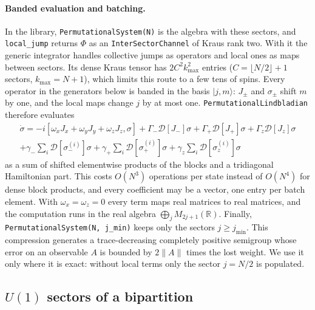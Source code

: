 \documentclass[11pt]{article}
\newcommand{\R}{\mathbb{R}}
\newcommand{\D}{\mathcal{D}}
\newcommand{\code}[1]{\nolinkurl{#1}}
\begin{document}
\paragraph{Banded evaluation and batching.} In the library, \code{PermutationalSystem(N)} is the algebra with these
sectors, and \code{local_jump} returns $\Phi$ as an \code{InterSectorChannel} of Kraus rank two. With it the generic
integrator handles collective jumps as operators and local ones as maps between sectors. Its dense Kraus tensor has
$2C^2k_{\max}^2$ entries ($C=\lfloor N/2\rfloor+1$ sectors, $k_{\max}=N+1$), which limits this route to a few tens of
spins. Every operator in the generators below is banded in the basis $|j,m\rangle$: $J_\pm$ and $\sigma_\pm$ shift $m$
by one, and the local maps change $j$ by at most one. \code{PermutationalLindbladian} therefore evaluates
\begin{multline}\label{eq:general}
  \dot\sigma=-i[\omega_xJ_x+\omega_yJ_y+\omega_zJ_z,\sigma]+\Gamma_-\D[J_-]\sigma+\Gamma_+\D[J_+]\sigma
  +\Gamma_z\D[J_z]\sigma\\
  +\gamma_-\sum_i\D[\sigma_-^{(i)}]\sigma+\gamma_+\sum_i\D[\sigma_+^{(i)}]\sigma+\gamma_z\sum_i\D[\sigma_z^{(i)}]\sigma
\end{multline}
as a sum of shifted elementwise products of the blocks and a tridiagonal Hamiltonian part. This costs
$O(N^3)$ operations per state instead of $O(N^4)$ for dense block products, and every coefficient may be a vector, one
entry per batch element. With $\omega_x=\omega_z=0$ every term maps real matrices to real matrices, and the
computation runs in the real algebra $\bigoplus_jM_{2j+1}(\R)$. Finally, \code{PermutationalSystem(N, j_min)} keeps
only the sectors $j\ge j_{\min}$. This compression generates a trace-decreasing completely positive semigroup whose
error on an observable $A$ is bounded by $2\|A\|$ times the lost weight. We use it only where it is exact: without
local terms only the sector $j=N/2$ is populated.

\subsection{\texorpdfstring{$U(1)$}{U(1)} sectors of a bipartition}\label{sec:u1}
\end{document}
